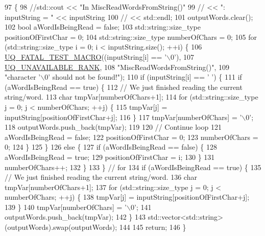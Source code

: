 \begin{DoxyCode}
97 \{
98   \textcolor{comment}{//std::cout << "In MiscReadWordsFromString()"}
99   \textcolor{comment}{//          << ": inputString = " << inputString}
100   \textcolor{comment}{//          << std::endl;}
101   outputWords.clear();
102   \textcolor{keywordtype}{bool} aWordIsBeingRead = \textcolor{keyword}{false};
103   std::string::size\_type positionOfFirstChar = 0;
104   std::string::size\_type numberOfChars = 0;
105   \textcolor{keywordflow}{for} (std::string::size\_type i = 0; i < inputString.size(); ++i) \{
106     \hyperlink{_defines_8h_a56d63d18d0a6d45757de47fcc06f574d}{UQ\_FATAL\_TEST\_MACRO}((inputString[i] == \textcolor{charliteral}{'\(\backslash\)0'}),
107                         \hyperlink{namespace_q_u_e_s_o_a7d4679800a430ae8e473c1c7bc0bfb21}{UQ\_UNAVAILABLE\_RANK},
108                         \textcolor{stringliteral}{"MiscReadWordsFromString()"},
109                         \textcolor{stringliteral}{"character '\(\backslash\)0' should not be found!"});
110     \textcolor{keywordflow}{if} (inputString[i] == \textcolor{charliteral}{' '}) \{
111       \textcolor{keywordflow}{if} (aWordIsBeingRead == \textcolor{keyword}{true}) \{
112         \textcolor{comment}{// We just finished reading the current string/word.}
113         \textcolor{keywordtype}{char} tmpVar[numberOfChars+1];
114         \textcolor{keywordflow}{for} (std::string::size\_type j = 0; j < numberOfChars; ++j) \{
115           tmpVar[j] = inputString[positionOfFirstChar+j];
116         \}
117         tmpVar[numberOfChars] = \textcolor{charliteral}{'\(\backslash\)0'};
118         outputWords.push\_back(tmpVar);
119 
120         \textcolor{comment}{// Continue loop}
121         aWordIsBeingRead = \textcolor{keyword}{false};
122         positionOfFirstChar = 0;
123         numberOfChars = 0;
124       \}
125     \}
126     \textcolor{keywordflow}{else} \{
127       \textcolor{keywordflow}{if} (aWordIsBeingRead == \textcolor{keyword}{false}) \{
128         aWordIsBeingRead = \textcolor{keyword}{true};
129         positionOfFirstChar = i;
130       \}
131       numberOfChars++;
132     \}
133   \} \textcolor{comment}{// for}
134   \textcolor{keywordflow}{if} (aWordIsBeingRead == \textcolor{keyword}{true}) \{
135     \textcolor{comment}{// We just finished reading the current string/word.}
136     \textcolor{keywordtype}{char} tmpVar[numberOfChars+1];
137     \textcolor{keywordflow}{for} (std::string::size\_type j = 0; j < numberOfChars; ++j) \{
138       tmpVar[j] = inputString[positionOfFirstChar+j];
139     \}
140     tmpVar[numberOfChars] = \textcolor{charliteral}{'\(\backslash\)0'};
141     outputWords.push\_back(tmpVar);
142   \}
143   std::vector<std::string>(outputWords).swap(outputWords);
144 
145   \textcolor{keywordflow}{return};
146 \}
\end{DoxyCode}
